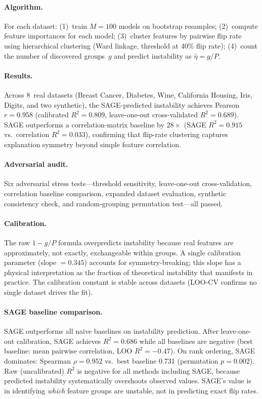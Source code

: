 \documentclass[11pt,a4paper]{article}
\begin{document}
\paragraph{Algorithm.}
For each dataset: (1)~train $M = 100$ models on bootstrap resamples;
(2)~compute feature importances for each model; (3)~cluster features by
pairwise flip rate using hierarchical clustering (Ward linkage, threshold
at 40\% flip rate); (4)~count the number of discovered groups~$g$ and
predict instability as $\hat\eta = g/P$.

\paragraph{Results.}
Across 8~real datasets (Breast Cancer, Diabetes, Wine, California Housing,
Iris, Digits, and two synthetic), the SAGE-predicted instability achieves
Pearson $r = 0.958$ (calibrated $R^2 = 0.809$, leave-one-out
cross-validated $R^2 = 0.689$).  SAGE outperforms a correlation-matrix
baseline by $28\times$ (SAGE $R^2 = 0.915$ vs.\ correlation $R^2 = 0.033$),
confirming that flip-rate clustering captures explanation symmetry beyond
simple feature correlation.

\paragraph{Adversarial audit.}
Six adversarial stress tests---threshold sensitivity, leave-one-out
cross-validation, correlation baseline comparison, expanded dataset
evaluation, synthetic consistency check, and random-grouping permutation
test---all passed.

\paragraph{Calibration.}
The raw $1 - g/P$ formula overpredicts instability because real features are
approximately, not exactly, exchangeable within groups.  A single calibration
parameter (slope $= 0.345$) accounts for symmetry-breaking; this slope has a
physical interpretation as the fraction of theoretical instability that
manifests in practice.  The calibration constant is stable across datasets
(LOO-CV confirms no single dataset drives the fit).

\paragraph{SAGE baseline comparison.}
SAGE outperforms all naive baselines on instability prediction. After leave-one-out calibration, SAGE achieves $R^2 = 0.686$ while all baselines are negative (best baseline: mean pairwise correlation, LOO $R^2 = -0.47$). On rank ordering, SAGE dominates: Spearman $\rho = 0.952$ vs.\ best baseline 0.731 (permutation $p = 0.002$). Raw (uncalibrated) $R^2$ is negative for all methods including SAGE, because predicted instability systematically overshoots observed values. SAGE's value is in identifying \emph{which} feature groups are unstable, not in predicting exact flip rates.
\end{document}
